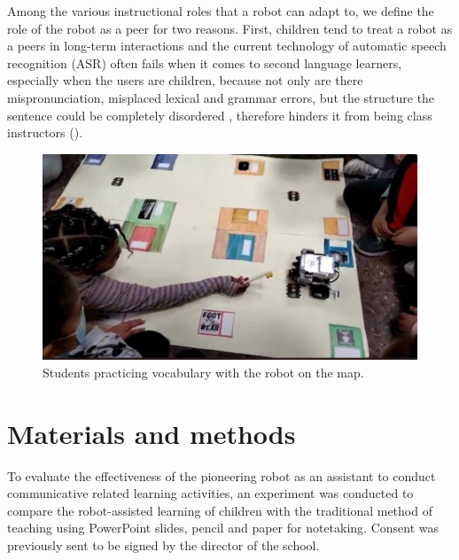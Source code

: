 \documentclass[english]{textolivre}
\begin{document}
Among the various instructional roles that a robot can adapt to, we define the role of the robot as a peer for two reasons. First, children tend to treat a robot as a peers in long-term interactions \cite{van_den_berghe_social_2019} and the current technology of automatic speech recognition (ASR) often fails when it comes to second language learners, especially when the users are children, because not only are there mispronunciation, misplaced lexical and grammar errors, but the structure the sentence could be completely disordered \cite{khalifa_joining--type_2016}, therefore hinders it from being class instructors ().

\begin{figure}[htbp]
\centering
\begin{minipage}{.85\textwidth}
 \includegraphics[width=\textwidth]{Fig6.png}
 \caption{Students practicing vocabulary with the robot on the map.}
 \label{fig06}
\end{minipage}
\end{figure}

\section{Materials and methods}\label{sec-titulo}
To evaluate the effectiveness of the pioneering robot as an assistant to conduct communicative related learning activities, an experiment was conducted to compare the robot-assisted learning of children with the traditional method of teaching using PowerPoint slides, pencil and paper for notetaking. Consent was previously sent to be signed by the director of the school.
\end{document}
